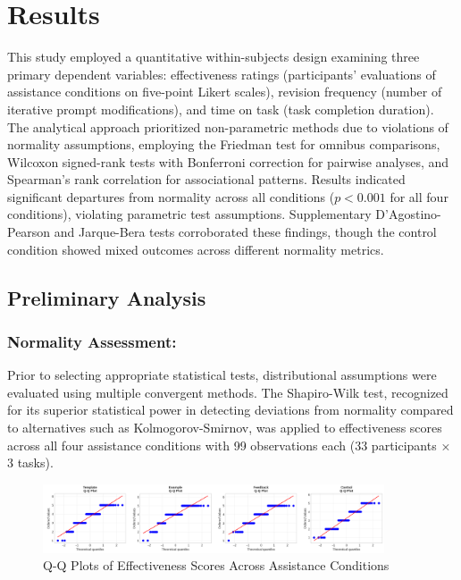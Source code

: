 \section{\textbf{Results}}

This study employed a quantitative within-subjects design examining three primary dependent variables: effectiveness ratings (participants' evaluations of assistance conditions on five-point Likert scales), revision frequency (number of iterative prompt modifications), and time on task (task completion duration). The analytical approach prioritized non-parametric methods due to violations of normality assumptions, employing the Friedman test for omnibus comparisons, Wilcoxon signed-rank tests with Bonferroni correction for pairwise analyses, and Spearman's rank correlation for associational patterns. Results indicated significant departures from normality across all conditions ($p < 0.001$ for all four conditions), violating parametric test assumptions. Supplementary D'Agostino-Pearson and Jarque-Bera tests corroborated these findings, though the control condition showed mixed outcomes across different normality metrics.

\subsection{\textbf{Preliminary Analysis}}

\subsubsection{Normality Assessment:}

Prior to selecting appropriate statistical tests, distributional assumptions were evaluated using multiple convergent methods. The Shapiro-Wilk test, recognized for its superior statistical power in detecting deviations from normality compared to alternatives such as Kolmogorov-Smirnov, was applied to effectiveness scores across all four assistance conditions with 99 observations each (33 participants × 3 tasks).

\begin{figure}[h]
\centering
\includegraphics[width=0.9\textwidth]{figures/01.png}
\caption{Q-Q Plots of Effectiveness Scores Across Assistance Conditions}
\label{fig:qq_plots}
\end{figure}

